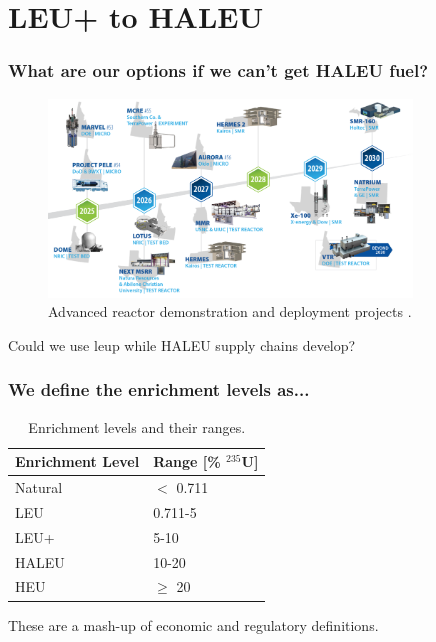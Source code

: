 \documentclass[9pt]{beamer}
\begin{document}
  \section{LEU+ to HALEU}
  \begin{frame}
    \frametitle{What are our options if we can't get HALEU fuel?}
    \begin{figure}
        \centering
        \includegraphics[width=0.86\textwidth]{../images/reactor_timeline.png}
        \caption{Advanced reactor demonstration and deployment projects \cite{inl_reactor_timeline}.}
    \end{figure}
    Could we use \gls{leup} while HALEU supply chains develop?
  \end{frame}

  \begin{frame}
    \frametitle{We define the enrichment levels as...}
    \begin{table}[H]
        \centering
        \caption{Enrichment levels and their ranges.}
        \label{tab:enrichment_levels}
        \begin{tabular}{l l}
           \hline
           \textbf{Enrichment Level} & \textbf{Range [\%  $^{235}$U]} \\
           \hline
           Natural & $<$ 0.711 \\
           LEU & 0.711-5 \\
           LEU+ & 5-10 \\
           HALEU & 10-20 \\
           HEU & $\geq$ 20  \\
           \hline
        \end{tabular}
     \end{table}
     \vspace{8pt}
     These are a mash-up of economic and regulatory definitions.
  \end{frame}
\end{document}
